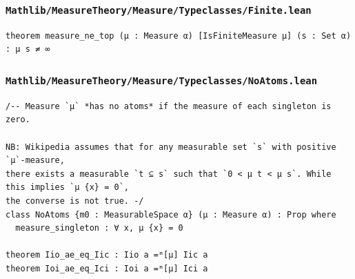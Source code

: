\subsubsection{\texttt{Mathlib/MeasureTheory/Measure/Typeclasses/Finite.lean}}
\begin{lstlisting}[language=lean]
theorem measure_ne_top (μ : Measure α) [IsFiniteMeasure μ] (s : Set α) : μ s ≠ ∞
\end{lstlisting}

\subsubsection{\texttt{Mathlib/MeasureTheory/Measure/Typeclasses/NoAtoms.lean}}
\begin{lstlisting}[language=lean]
/-- Measure `μ` *has no atoms* if the measure of each singleton is zero.

NB: Wikipedia assumes that for any measurable set `s` with positive `μ`-measure,
there exists a measurable `t ⊆ s` such that `0 < μ t < μ s`. While this implies `μ {x} = 0`,
the converse is not true. -/
class NoAtoms {m0 : MeasurableSpace α} (μ : Measure α) : Prop where
  measure_singleton : ∀ x, μ {x} = 0

theorem Iio_ae_eq_Iic : Iio a =ᵐ[μ] Iic a
theorem Ioi_ae_eq_Ici : Ioi a =ᵐ[μ] Ici a
\end{lstlisting}

\newpage

